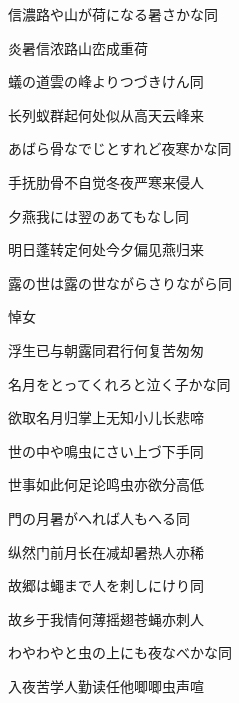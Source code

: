 \begin{haiku}
    {\FH 信濃路や山が荷になる暑さかな}\hfill{\FH 同}

    {\FK 炎暑信浓路山峦成重荷}
\end{haiku}

\begin{haiku}
    {\FH 蟻の道雲の峰よりつづきけん}\hfill{\FH 同}

    {\FK 长列蚁群起何处似从高天云峰来}
\end{haiku}

\begin{haiku}
    {\FH あばら骨なでじとすれど夜寒かな}\hfill{\FH 同}

    {\FK 手抚肋骨不自觉冬夜严寒来侵人}
\end{haiku}

\begin{haiku}
    {\FH 夕燕我には翌のあてもなし}\hfill{\FH 同}

    {\FK 明日蓬转定何处今夕偏见燕归来}
\end{haiku}

\begin{haiku}
    {\FH 露の世は露の世ながらさりながら}\hfill{\FH 同}

    {\FK 悼女}

    {\FK 浮生已与朝露同君行何复苦匆匆}
\end{haiku}

\begin{haiku}
    {\FH 名月をとってくれろと泣く子かな}\hfill{\FH 同}

    {\FK 欲取名月归掌上无知小儿长悲啼}
\end{haiku}

\begin{haiku}
    {\FH 世の中や鳴虫にさい上づ下手}\hfill{\FH 同}

    {\FK 世事如此何足论鸣虫亦欲分高低}
\end{haiku}

\begin{haiku}
    {\FH 門の月暑がへれば人もへる}\hfill{\FH 同}

    {\FK 纵然门前月长在减却暑热人亦稀}
\end{haiku}

\begin{haiku}
    {\FH 故郷は蠅まで人を刺しにけり}\hfill{\FH 同}

    {\FK 故乡于我情何薄摇翅苍蝇亦刺人}
\end{haiku}

\begin{haiku}
    {\FH わやわやと虫の上にも夜なべかな}\hfill{\FH 同}

    {\FK 入夜苦学人勤读任他唧唧虫声喧}
\end{haiku}

